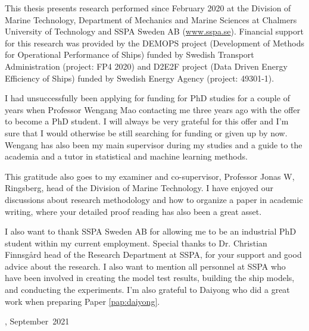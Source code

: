 This thesis presents research performed since February 2020 at the Division of Marine Technology, Department of Mechanics and Marine Sciences at Chalmers University of Technology and SSPA Sweden AB (\href{www.sspa.se}{www.sspa.se}). Financial support for this research was provided by the DEMOPS project (Development of Methods for Operational Performance of Ships) funded by Swedish Transport Administration (project: FP4 2020) and D2E2F project (Data Driven Energy Efficiency of Ships) funded by Swedish Energy Agency (project: 49301-1).

I had unsuccessfully been applying for funding for PhD studies for a couple of years when Professor Wengang Mao contacting me three years ago with the offer to become a PhD student. I will always be very grateful for this offer and I'm sure that I would otherwise be still searching for funding or given up by now. Wengang has also been my main supervisor during my studies and a guide to the academia and a tutor in statistical and machine learning methods.  

This gratitude also goes to my examiner and co-supervisor, Professor Jonas W, Ringsberg,
head of the Division of Marine Technology. I have enjoyed our discussions about research methodology and how to organize a paper in academic writing, where your detailed proof reading has also been a great asset.

I also want to thank SSPA Sweden AB for allowing me to be an industrial PhD student within my current employment. Special thanks to Dr. Christian Finnsgård head of the Research Department at SSPA, for your support and good advice about the research. I also want to mention all personnel at SSPA who have been involved in creating the model test results, building the ship models, and conducting the experiments.
I'm also grateful to Daiyong who did a great work when preparing Paper \ref{pap:daiyong}.

\vskip 2pc

\noindent \thesisauthor

\noindent \thesiscity, September\  2021  %
